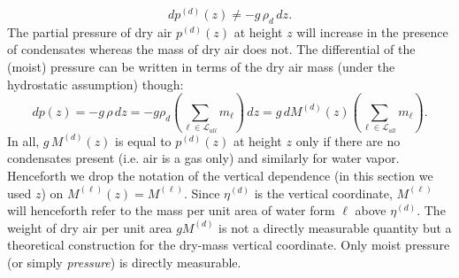 \documentclass{agujournal}
\begin{document}
{\begin{equation}
dp^{(d)}(z)\ne -g\, \rho_d\, dz.
\end{equation}
The partial pressure of dry air $p^{(d)}(z)$ at height $z$ will increase in the presence of condensates whereas the mass of dry air does not. The differential of the (moist) pressure can be written in terms of the dry air mass (under the hydrostatic assumption) though:
\begin{equation}
dp(z)=-g\, \rho \, dz = -g\rho_d \left( \sum_{\ell \in \mathcal{L}_{all}} m_\ell\right)\, dz = g\, dM^{(d)}(z)\left( \sum_{\ell \in \mathcal{L}_{all}} m_\ell\right).
\end{equation}
In all, $g\, M^{(d)}(z)$ is equal to $p^{(d)}(z)$ at height $z$ only if there are no condensates present (i.e. air is a gas only) and similarly for water vapor. Henceforth we drop the notation of the vertical dependence (in this section we used $z$) on $M^{(\ell)}(z)=M^{(\ell)}$. Since $\eta^{(d)}$ is the vertical coordinate, $M^{(\ell)}$ will henceforth refer to the mass per unit area of  water form $\ell$ above $\eta^{(d)}$. The weight of dry air per unit area $g M^{(d)}$ is not a directly measurable quantity but a theoretical construction for the dry-mass vertical coordinate. Only moist pressure (or simply {\em{pressure}}) is directly measurable.

%
}
\end{document}
